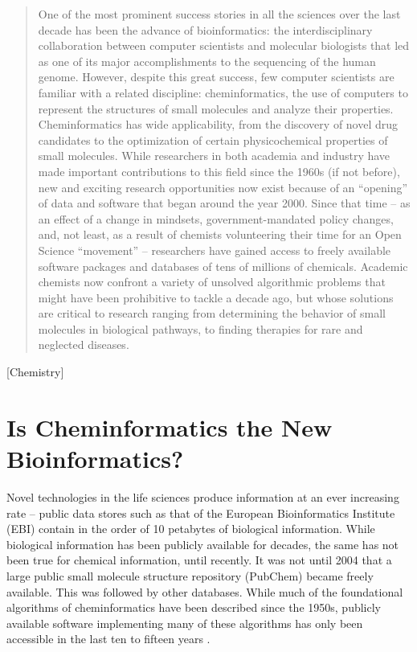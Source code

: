 \documentclass{sig-alternate}
\begin{document}
\maketitle
\begin{abstract}
  One of the most prominent success stories in all the sciences over
  the last decade has been the advance of bioinformatics: the
  interdisciplinary collaboration between computer scientists and
  molecular biologists that led as one of its major accomplishments to the
  sequencing of the human genome. However,
  despite this great success, few computer scientists are familiar
  with a related discipline: cheminformatics, the use of computers to
  represent the structures of small molecules and analyze their
  properties.  Cheminformatics has wide applicability, from the
  discovery of novel drug candidates to the optimization of certain
  physicochemical properties of small molecules. While researchers in both academia and industry have made important contributions to this field since the 1960s (if not before), new and exciting research opportunities now exist because of an ``opening'' of data and software that began around the year 2000.  Since that time -- as an
  effect of a change in mindsets, government-mandated policy changes,
  and, not least, as a result of chemists volunteering their time
  for an Open Science ``movement'' -- researchers have gained access to
  freely available software packages and databases of tens of millions
  of chemicals. Academic chemists now confront a variety of unsolved
  algorithmic problems that might have been prohibitive to tackle a decade ago,
  but whose solutions are critical to research ranging from
  determining the behavior of small molecules in biological pathways,
  to finding therapies for rare and neglected diseases.
\end{abstract}

[Chemistry]

\section{Is Cheminformatics the New \\Bioinformatics?}

Novel technologies in the life sciences produce information at an
ever increasing rate -- public data stores such as that of the
European Bioinformatics Institute (EBI) contain in the order of 10
petabytes of biological information.  While biological information has
been publicly available for decades, the same has not been true for
chemical information, until recently. It was not until 2004 that a
large public small molecule structure repository (PubChem) became
freely available. This was followed by other databases. While much of
the foundational algorithms of cheminformatics have been described
since the 1950s, publicly available software implementing many of
these algorithms has only been accessible in the last ten to fifteen
years \cite{faulon2010}.
\end{document}
